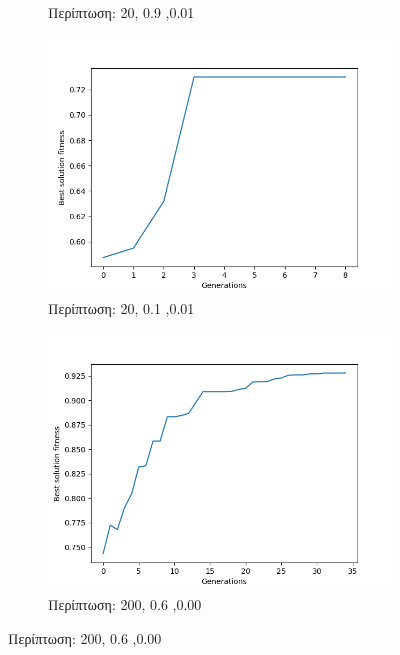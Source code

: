\documentclass[12pt,a4paper]{article}
\begin{document}
\begin{enumerate}
\begin{figure}[H]
\begin{subfigure}[h]{0.7\textwidth}
                         \caption*{Περίπτωση: 20, 0.9 ,0.01}
                     \end{subfigure}
                     \begin{subfigure}[h]{0.7\textwidth}
                         \centering
                         \includegraphics[width=\textwidth]{images/5s.png}
                         \caption*{Περίπτωση: 20, 0.1 ,0.01}
                     \end{subfigure}
                     \begin{subfigure}[H]{0.7\textwidth}
                         \centering
                         \includegraphics[width=\textwidth]{images/6s.png}
                         \caption*{Περίπτωση: 200, 0.6 ,0.00}

\end{subfigure}
\end{figure}
\end{enumerate}
\end{document}

